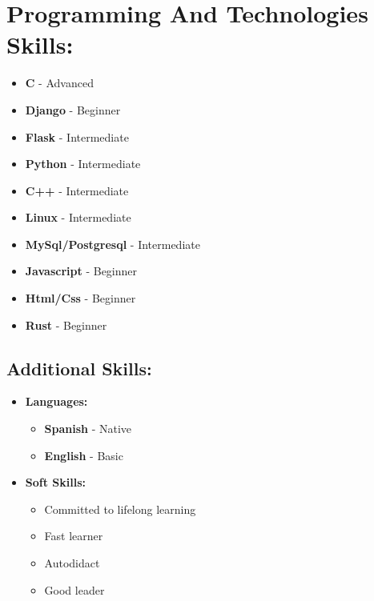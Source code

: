 \documentclass{article}
\begin{document}
\begin{minipage}[t]{8cm}
\begin{itemize}
  
\end{itemize}

\section*{Programming And Technologies Skills:}
\begin{itemize}
  \setlength\itemsep{0.01cm}
\item \textbf{C} - Advanced
\item \textbf{Django} - Beginner  
\item \textbf{Flask} - Intermediate  
\item \textbf{Python} - Intermediate
\item \textbf{C++} - Intermediate
\item \textbf{Linux} - Intermediate
\item \textbf{MySql/Postgresql} - Intermediate  
\item \textbf{Javascript} - Beginner 
\item \textbf{Html/Css} - Beginner
\item \textbf{Rust} - Beginner
\end{itemize}

\subsection*{Additional Skills:}
\begin{itemize}
  \setlength\itemsep{0.01cm}
\item \textbf{Languages:}
  \begin{itemize}[label = {-}]
  \setlength\itemsep{0.01cm}
  \item \textbf{Spanish} - Native
  \item \textbf{English} - Basic 
  \end{itemize}
\item \textbf{Soft Skills:}
  \begin{itemize}[label = {-}]
  \setlength\itemsep{0.01cm}
  \item Committed to lifelong learning 
  \item Fast learner
  \item Autodidact
  \item Good leader
  \end{itemize}
\end{itemize}

\end{minipage}
\end{document}
